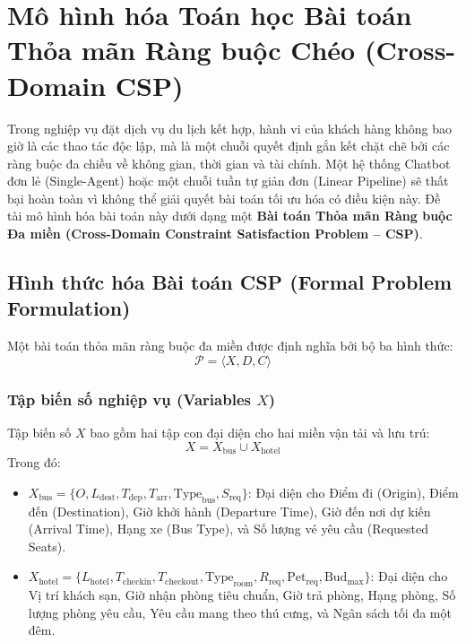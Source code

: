\section{Mô hình hóa Toán học Bài toán Thỏa mãn Ràng buộc Chéo (Cross-Domain CSP)}
\label{sec:mo_hinh_hoa_csp}

Trong nghiệp vụ đặt dịch vụ du lịch kết hợp, hành vi của khách hàng không bao giờ là các thao tác độc lập, mà là một chuỗi quyết định gắn kết chặt chẽ bởi các ràng buộc đa chiều về không gian, thời gian và tài chính. Một hệ thống Chatbot đơn lẻ (Single-Agent) hoặc một chuỗi tuần tự giản đơn (Linear Pipeline) sẽ thất bại hoàn toàn vì không thể giải quyết bài toán tối ưu hóa có điều kiện này. Đề tài mô hình hóa bài toán này dưới dạng một \textbf{Bài toán Thỏa mãn Ràng buộc Đa miền (Cross-Domain Constraint Satisfaction Problem -- CSP)}.

\subsection{Hình thức hóa Bài toán CSP (Formal Problem Formulation)}
\label{subsec:csp_formulation}

Một bài toán thỏa mãn ràng buộc đa miền được định nghĩa bởi bộ ba hình thức:
\begin{equation}
\mathcal{P} = \langle X, D, C \rangle
\end{equation}

\subsubsection{Tập biến số nghiệp vụ (Variables $X$)}
Tập biến số $X$ bao gồm hai tập con đại diện cho hai miền vận tải và lưu trú:
\begin{equation}
X = X_{\text{bus}} \cup X_{\text{hotel}}
\end{equation}
Trong đó:
\begin{itemize}
    \item $X_{\text{bus}} = \{O, L_{\text{dest}}, T_{\text{dep}}, T_{\text{arr}}, \text{Type}_{\text{bus}}, S_{\text{req}}\}$: Đại diện cho Điểm đi (Origin), Điểm đến (Destination), Giờ khởi hành (Departure Time), Giờ đến nơi dự kiến (Arrival Time), Hạng xe (Bus Type), và Số lượng vé yêu cầu (Requested Seats).
    \item $X_{\text{hotel}} = \{L_{\text{hotel}}, T_{\text{checkin}}, T_{\text{checkout}}, \text{Type}_{\text{room}}, R_{\text{req}}, \text{Pet}_{\text{req}}, \text{Bud}_{\text{max}}\}$: Đại diện cho Vị trí khách sạn, Giờ nhận phòng tiêu chuẩn, Giờ trả phòng, Hạng phòng, Số lượng phòng yêu cầu, Yêu cầu mang theo thú cưng, và Ngân sách tối đa một đêm.
\end{itemize}

